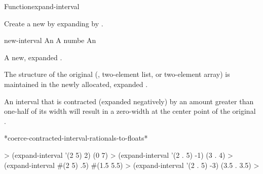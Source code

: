\documentclass[10pt,twoside,english,pdftex]{article}
\begin{document}
\begin{functiondoc}{Function}{expand-interval}%
  {
    \returns{} }
%
%

\fnsyntax

\fnpurpose Create a new  by expanding  by
.

\fnpackage {}

\fnmodule {}

\fnargs
\begin{args}{new-interval}
\arg[interval] An 
\arg[amount] A numbe
 An 
\end{args}

\fnreturns A new, expanded .

\fndescription The structure of the original 
(, two-element list, or two-element array) is maintained in the
newly allocated, expanded .

An interval that is contracted (expanded negatively) by an amount greater than
one-half of its width will result in a zero-width  at the
center point of the original .

\begin{alsos}{*coerce-contracted-interval-rationals-to-floats*}
\end{alsos}

\fnexamples
%
\W\supp
\begin{example}
  > (expand-interval '(2 5) 2)
  (0 7)
  > (expand-interval '(2 . 5) -1)
  (3 . 4)\goodpagebreak
  > (expand-interval #(2 5) .5)
  #(1.5 5.5)
  > (expand-interval '(2 . 5) -3)
  (3.5 . 3.5)
  >
\end{example}

\end{functiondoc}

\end{document}

